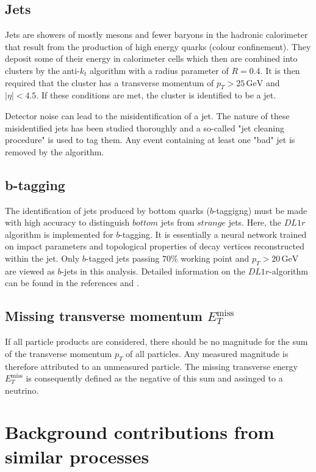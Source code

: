\subsection{Jets}
\label{sec:jets}
Jets are showers of mostly mesons and fewer baryons in the hadronic calorimeter that result from the production of high energy quarks (colour confinement). They deposit some of their energy in calorimeter cells which then are combined into clusters by the anti-$k_t$ algorithm \cite{anti_k_t} with a radius parameter of $R = 0.4$. 
It is then required that the cluster has a transverse momentum of $p_T > 25 \,\si{\giga\electronvolt}$ and $\bigl|\eta\bigr| < 4.5$. If these conditions are met, the cluster is identified to be a jet.

Detector noise can lead to the misidentification of a jet. The nature of these misidentified jets has been studied thoroughly and a so-called "jet cleaning procedure" is used to tag them. 
Any event containing at least one "bad" jet is removed by the algorithm. 
\subsection{b-tagging}
\label{sec:btagging}

The identification of jets produced by bottom quarks ($b$-taggigng) must be made with high accuracy to distinguish $bottom$ jets from $strange$ jets. Here, the $DL1r$ algorithm is implemented for $b$-tagging. It is essentially a neural network trained 
on impact parameters and topological properties of decay vertices reconstructed within the jet. Only $b$-tagged jets passing $70\%$ working point and $p_T >20 \,\si{\giga\electronvolt}$ are viewed as $b$-jets in this analysis. 
Detailed information on the $DL1r$-algorithm can be found in the references \cite{btag1} and \cite{btag2}.

\subsection{Missing transverse momentum \texorpdfstring{$E_T^{\text{miss}}$}{}}

If all particle products are considered, there should be no magnitude for the sum of the transverse momentum $p_T$ of all particles. 
Any measured magnitude is therefore attributed to an unmeasured particle. The missing transverse energy $E_T^{\text{miss}}$ is consequently defined as the negative of this sum and assinged to a neutrino. 

\section{Background contributions from similar processes}



